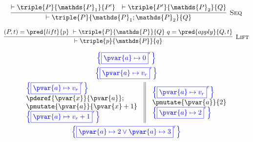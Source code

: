 \[
\infer[\textsc{Seq}]
{
	\vdash \triple
	{P}
	{\mathds{P}_1; \mathds{P}_2}
	{Q}
}
{
	\vdash \triple
	{P}
	{\mathds{P}_1}
	{P'}\ \
	\vdash \triple
	{P'}
	{\mathds{P}_2}
	{Q}
}
\]

\[
\infer[\textsc{Lift}]
{
	\vdash \triple
	{p}
	{\mathds{P}}
	{q}
}
{
	(P, t) = \pred{lift}{p}\
	\vdash \triple
	{P}
	{\mathds{P}}
	{Q}\
	q = \pred{apply}{Q, t}
}
\]



\iffalse
\begin{gather*}
\color{blue} \left\lbrace \boxed{\pvar{a} \mapsto 0}^r \right\rbrace \\
\color{blue} \left\lbrace \boxed{\pvar{a} \mapsto v_r}^r \right\rbrace \\
\begin{array}{c || c}
\begin{array}{l}
\color{blue} \left\lbrace \boxed{\pvar{a} \mapsto v_r}^r \right\rbrace \\
\pderef{\pvar{x}}{\pvar{a}}; \\
\pmutate{\pvar{a}}{\pvar{x} + 1} \\
\color{blue} \left\lbrace \boxed{\pvar{a} \mapsto v_r + 1}^r \right\rbrace
\end{array}
&
\begin{array}{l}
\color{blue} \left\lbrace \boxed{\pvar{a} \mapsto v_r}^r \right\rbrace \\
\pmutate{\pvar{a}}{2} \\
\color{blue} \left\lbrace \boxed{\pvar{a} \mapsto 2}^r \right\rbrace
\end{array}
\end{array} \\
\color{blue} \left\lbrace \boxed{\pvar{a} \mapsto 2 \lor \pvar{a} \mapsto 3}^r \right\rbrace
\end{gather*}

